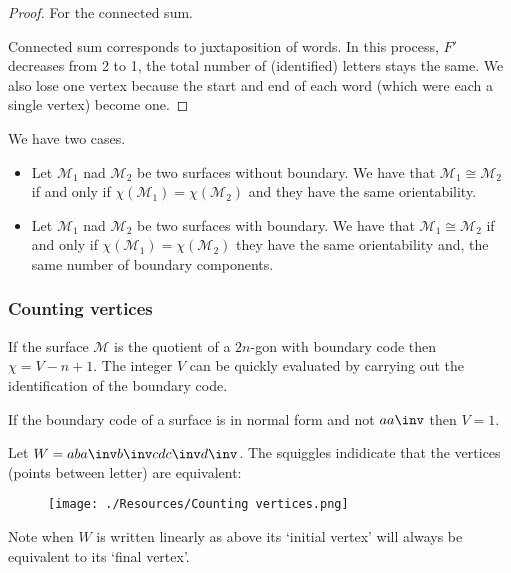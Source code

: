 \documentclass[12pt, a4paper]{article}
\begin{document}
\begin{proof}
    For the connected sum.
    
    Connected sum corresponds to juxtaposition of words. In this process, \( F' \) decreases from 2 to 1, the total number of (identified) letters stays the same. We also lose one vertex because the start and end of each word (which were each a single vertex) become one.
\end{proof}

\begin{mdthm}
    We have two cases.
    \begin{itemize}
        \item Let \(\mathcal{M}_1\) nad \(\mathcal{M}_2\)  be two surfaces without boundary. We have that \(\mathcal{M}_1 \cong \mathcal{M}_2\) if and only if \(\chi(\mathcal{M}_1)=\chi(\mathcal{M}_2)\) and they have the same orientability.
        \item Let \(\mathcal{M}_1\) nad \(\mathcal{M}_2\)  be two surfaces with boundary. We have that \(\mathcal{M}_1 \cong \mathcal{M}_2\) if and only if \(\chi(\mathcal{M}_1)=\chi(\mathcal{M}_2)\) they have the same orientability and, the same number of boundary components.
    \end{itemize}
\end{mdthm}

\subsubsection{Counting vertices}

If the surface \(\mathcal{M}\) is the quotient of a \(2n\)-gon with boundary code then \(\chi=V-n+1\). The integer \(V\) can be quickly evaluated by carrying out the identification of the boundary code.

\begin{mdprop}
    If the boundary code of a surface is in normal form and not \(aa\inv\) then \(V=1\).
\end{mdprop}

\begin{mdexample}
    Let \(W =aba\inv b\inv cdc\inv d\inv\). The squiggles indidicate that the vertices (points between letter) are equivalent:
    \begin{figure}[H]
         \begin{center}
             \texttt{[image: ./Resources/Counting vertices.png]}
         \end{center}
    \end{figure}
    Note when \(W\) is written linearly as above its `initial vertex' will always be equivalent to its `final vertex'.
\end{mdexample}
\end{document}
